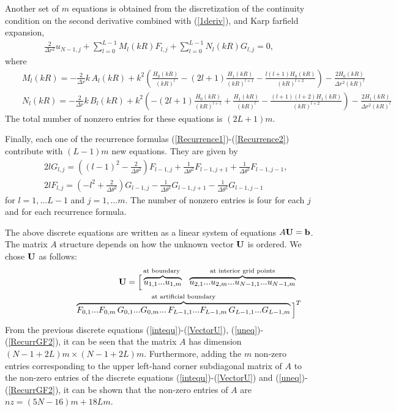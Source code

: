 \documentclass[final,3p,times,12pt]{elsarticle}
\begin{document}
Another set of $m$ equations is obtained from the discretization of the continuity condition on the second derivative combined with (\ref{1deriv}), and Karp farfield expansion,
\begin{eqnarray}
\frac{2}{\Delta r^2}u_{N-1,j} + \sum_{l=0}^{L-1}M_l(kR)F_{l,j} + \sum_{l=0}^{L-1}N_l(kR)G_{l,j}=0,
\end{eqnarray}
where 
\begin{eqnarray}
&&M_l(kR) =- \frac{2}{\Delta r} k\, A_l(kR) +
k^2\left(\frac{H_0(kR)}{(kR)^l} - (2l+1) \frac{H_1(kR)}{(kR)^{l+1}}- \frac{l(l+1)H_0(kR)}
{(kR)^{l+2}}\right) - \frac{2H_0(kR)}{\Delta r^2(kR)^l} \nonumber\\
&& N_l(kR) = - \frac{2}{\Delta r} k \,B_l(kR)+
k^2\left(-(2l+1)\frac{H_0(kR)}{(kR)^{l+1}} +\frac{H_1(kR)}{(kR)^{l}}- \frac{(l+1)(l+2)H_1(kR)}
{(kR)^{l+2}}\right) - \frac{2H_1(kR)}{\Delta r^2(kR)^l} \nonumber
\end{eqnarray}
The total number of nonzero entries for these equations is $(2L+1)m$.

Finally, each one of the recurrence formulas (\ref{Recurrence1})-(\ref{Recurrence2}) contribute with $(L-1)m$  new equations. They are given by
\begin{eqnarray}
 &&2lG_{l,j} = \left((l-1)^2 -\frac{2}{\Delta \theta^2}\right)F_{l-1,j} + \frac{1}{\Delta \theta^2}F_{l-1,j+1} + \frac{1}{\Delta \theta^2}F_{l-1,j-1}, \label{RecurrGF1}  \\
 &&2lF_{l,j} = \left(-l^2 +\frac{2}{\Delta \theta^2}\right)G_{l-1,j} - \frac{1}{\Delta \theta^2}G_{l-1,j+1} - \frac{1}{\Delta \theta^2}G_{l-1,j-1}  \label{RecurrGF2}
\end{eqnarray}
for $l=1,\dots L-1$ and $j=1,\dots m$. The number of nonzero entries is four for each $j$ and for each recurrence formula.

The above discrete equations are written as a linear system of equations $A{\bf U} = {\bf b}$. The matrix $A$ structure depends on how the unknown vector ${\bf U}$ is ordered. We chose ${\bf U}$ as follows:
\begin{eqnarray}
&&{\bf U}=
\Big[ \overbrace{u_{1,1} ...u_{1,m}}^{\text{at boundary }} ~ ~
\overbrace{u_{2,1} ...u_{2,m}...
u_{N-1,1}...u_{N-1,m}}^{\text{at interior grid points}} ~ ~\nonumber\\
&&\qquad\qquad\qquad\overbrace{F_{0,1}...F_{0,m}\, G_{0,1}...G_{0,m}...\,F_{L-1,1}...F_{L-1,m}\,G_{L-1,1}...G_{L-1,m}}^{\text{at artificial boundary}}
 \Big]^{T} \label{VectorU}
\end{eqnarray}
From the previous discrete equations (\ref{intequ})-(\ref{VectorU}), (\ref{uneq})-(\ref{RecurrGF2}), it can be seen that the matrix $A$ has dimension $(N-1+2L)m\times(N-1+2L)m$. Furthermore, adding the $m$ non-zero entries corresponding to the upper left-hand corner subdiagonal matrix of $A$ to the non-zero entries of the discrete equations  (\ref{intequ})-(\ref{VectorU}) and (\ref{uneq})-(\ref{RecurrGF2}), it can be shown that the non-zero entries of $A$ are $nz=(5N-16)m+18Lm$. 
\end{document}
